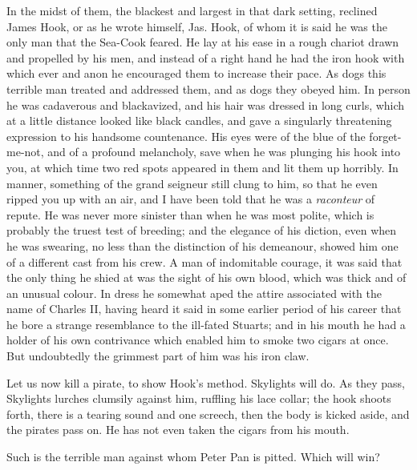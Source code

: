 In the midst of them, the blackest and largest in that dark setting,
reclined James Hook, or as he wrote himself, Jas. Hook, of whom it is said
he was the only man that the Sea-Cook feared. He lay at his ease in a
rough chariot drawn and propelled by his men, and instead of a right hand
he had the iron hook with which ever and anon he encouraged them to
increase their pace. As dogs this terrible man treated and addressed them,
and as dogs they obeyed him. In person he was cadaverous
and blackavized, and his hair was dressed in long curls,
which at a little distance looked like black candles, and gave a
singularly threatening expression to his handsome countenance. His eyes
were of the blue of the forget-me-not, and of a profound melancholy, save
when he was plunging his hook into you, at which time two red spots
appeared in them and lit them up horribly. In manner, something of the
grand seigneur still clung to him, so that he even ripped you up with an
air, and I have been told that he was a \emph{raconteur} of repute.
He was never more sinister than when he was most polite, which is probably
the truest test of breeding; and the elegance of his diction, even when he
was swearing, no less than the distinction of his demeanour, showed him
one of a different cast from his crew. A man of indomitable courage, it
was said that the only thing he shied at was the sight of his own blood,
which was thick and of an unusual colour. In dress he somewhat aped the
attire associated with the name of Charles II, having heard it said in
some earlier period of his career that he bore a strange resemblance to
the ill-fated Stuarts; and in his mouth he had a holder of his own
contrivance which enabled him to smoke two cigars at once. But undoubtedly
the grimmest part of him was his iron claw.


Let us now kill a pirate, to show Hook's method. Skylights will do. As
they pass, Skylights lurches clumsily against him, ruffling his lace
collar; the hook shoots forth, there is a tearing sound and one screech,
then the body is kicked aside, and the pirates pass on. He has not even
taken the cigars from his mouth.


Such is the terrible man against whom Peter Pan is pitted. Which will win?


